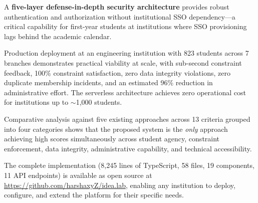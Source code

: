 \documentclass[conference]{IEEEtran}
\begin{document}
A \textbf{five-layer defense-in-depth security architecture} provides robust authentication and authorization without institutional SSO dependency---a critical capability for first-year students at institutions where SSO provisioning lags behind the academic calendar.

Production deployment at an engineering institution with 823 students across 7 branches demonstrates practical viability at scale, with sub-second constraint feedback, 100\% constraint satisfaction, zero data integrity violations, zero duplicate membership incidents, and an estimated 96\% reduction in administrative effort. The serverless architecture achieves zero operational cost for institutions up to $\sim$1,000 students.

Comparative analysis against five existing approaches across 13 criteria grouped into four categories shows that the proposed system is the \textit{only} approach achieving high scores simultaneously across student agency, constraint enforcement, data integrity, administrative capability, and technical accessibility.

The complete implementation (8,245 lines of TypeScript, 58 files, 19 components, 11 API endpoints) is available as open source at \url{https://github.com/harshaxyZ/idea.lab}, enabling any institution to deploy, configure, and extend the platform for their specific needs.
\end{document}
